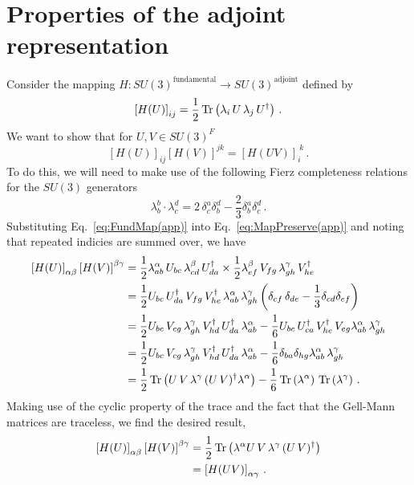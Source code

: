 \section{Properties of the adjoint representation}
\label{app:RepMapProof}
Consider the mapping $H:SU(3)^\text{fundamental}\rightarrow SU(3)^\text{adjoint}$ defined by
%
\begin{equation}
\left[H(U)\right]_{ij} = \frac{1}{2}\operatorname{Tr}\left(\lambda_i \, U \, \lambda_j\, U^\dagger\right)\, .
\label{eq:FundMap(app)}
\end{equation}
%
We want to show that for $U,V\in SU(3)^F$
%
\begin{equation}
\left[H(U)\right]_{ij}\left[H(V)\right]^{jk} = \left[H(U V)\right]_i^{~k}\, .
\label{eq:MapPreserve(app)}
\end{equation}
%
To do this, we will need to make use of the following Fierz completeness relations for the $SU(3)$  generators
%
\begin{equation}
\lambda _ { b } ^ { b } \cdot \lambda _ { c } ^ { d } = 2\, \delta _ { c } ^ { a } \delta _ { b } ^ { d } - \frac { 2 } { 3 } \delta _ { b } ^ { a } \delta _ { c } ^ { d }\, .
\end{equation}
%
Substituting Eq.~\eqref{eq:FundMap(app)} into Eq.~\eqref{eq:MapPreserve(app)} and noting that repeated indicies are summed over, we have
\begin{align*}
\left[H(U)\right]_{\alpha\beta}\left[H(V)\right]^{\beta\gamma} &= \frac{1}{2} \lambda^\alpha_{ab}\, U_{bc}\,\lambda^\beta_{cd}\, U^\dagger_{da} \times \frac{1}{2} \lambda^\beta_{ef}\, V_{fg}\,\lambda^\gamma_{gh}\, V^\dagger_{he}\\
&=\frac{1}{2} U_{bc}\,U^\dagger_{da}\,V_{fg}\,V^\dagger_{he}\,\lambda^\alpha_{ab}\, \lambda^\gamma_{gh} \left(\delta_{cf}\,\delta_{de} - \frac{1}{3}\delta_{cd}\delta_{ef}\right)\\
&=\frac{1}{2}U_{bc} \, V_{cg} \, \lambda^\gamma_{gh} \, V^\dagger_{hd} \, U^\dagger_{da} \, \lambda^\alpha_{ab} - \frac{1}{6} U_{bc} \, U^\dagger_{ca} \, V^\dagger_{he} \, V_{eg} \lambda^\alpha_{ab}\, \lambda^\gamma_{gh}\\
&= \frac{1}{2}U_{bc} \, V_{cg} \, \lambda^\gamma_{gh} \, V^\dagger_{hd} \, U^\dagger_{da} \, \lambda^\alpha_{ab} - \frac{1}{6}\delta_{ba}\delta_{hg} \lambda^\alpha_{ab}\, \lambda^\gamma_{gh}\\
&=\frac{1}{2}\operatorname{Tr}\left(U \, V \, \lambda^\gamma \, (U \, V)^\dagger \lambda^\alpha\right) - \frac{1}{6}\operatorname{Tr}\left(\lambda^\alpha\right) \, \operatorname{Tr}\left(\lambda^\gamma\right)\, .
\end{align*}
Making use of the cyclic property of the trace and the fact that the Gell-Mann matrices are traceless, we find the desired result,
%
\begin{align*}
\left[H(U)\right]_{\alpha\beta}\left[H(V)\right]^{\beta\gamma} &= \frac{1}{2}\operatorname{Tr}\left(\lambda^\alpha U \, V \, \lambda^\gamma \, (U \, V)^\dagger \right)\\
&= \left[H(UV)\right]_{\alpha\gamma} \, .
\end{align*}\\

